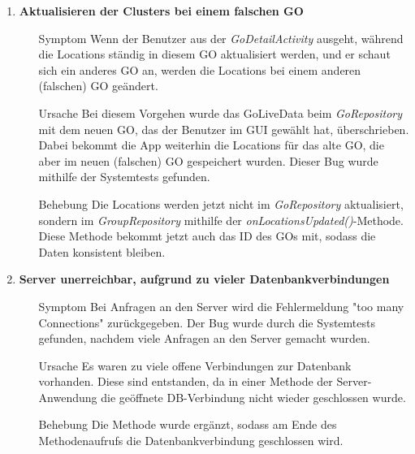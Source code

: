 \documentclass[11pt,a4paper]{scrartcl}
\def\threedigits#1{%
  \ifnum#1<100 0\fi
  \ifnum#1<10 0\fi
  \number#1}
\begin{document}
\begin{enumerate}[label={\textbf{/B\protect\threedigits{\theenumi}0/}}, leftmargin=*]
\item \textbf{Aktualisieren der Clusters bei einem falschen GO}
	\begin{itemize}
		\item[Symptom] Wenn der Benutzer aus der \textit{GoDetailActivity} ausgeht, während die Locations ständig in diesem GO aktualisiert werden, und er schaut sich ein anderes GO an, werden die Locations bei einem anderen (falschen) GO geändert.
		\item[Ursache] Bei diesem Vorgehen wurde das GoLiveData beim \textit{GoRepository} mit dem neuen GO, das der Benutzer im GUI gewählt hat, überschrieben. Dabei bekommt die App weiterhin die Locations für das alte GO, die aber im neuen (falschen) GO gespeichert wurden. Dieser Bug wurde mithilfe der Systemtests gefunden.
		\item[Behebung] Die Locations werden jetzt nicht im \textit{GoRepository} aktualisiert, sondern im \textit{GroupRepository} mithilfe der \textit{onLocationsUpdated()}-Methode. Diese Methode bekommt jetzt auch das ID des GOs mit, sodass die Daten konsistent bleiben.
	\end{itemize}
	
\item \textbf{Server unerreichbar, aufgrund zu vieler Datenbankverbindungen}
	\begin{itemize}
		\item[Symptom] Bei Anfragen an den Server wird die Fehlermeldung "too many Connections" zurückgegeben. Der Bug wurde durch die Systemtests gefunden, nachdem viele Anfragen an den Server gemacht wurden.
		\item[Ursache] Es waren zu viele offene Verbindungen zur Datenbank vorhanden. Diese sind entstanden, da in einer Methode der Server-Anwendung die geöffnete DB-Verbindung nicht wieder geschlossen wurde.
		\item[Behebung] Die Methode wurde ergänzt, sodass am Ende des Methodenaufrufs die Datenbankverbindung geschlossen wird.
	\end{itemize}

\end{enumerate}
\end{document}
